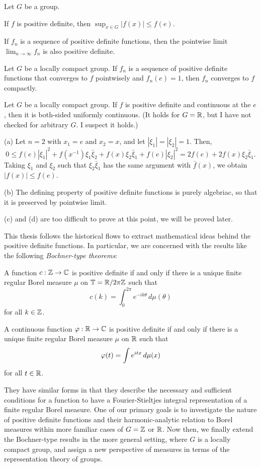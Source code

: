 \documentclass[12pt]{article}
\begin{document}
\begin{prop}
Let $G$ be a group.
\begin{parts}
\item If $f$ is positive definite, then $\sup_{x\in G}|f(x)|\le f(e)$.
\item If $f_n$ is a sequence of positive definite functions, then the pointwise limit $\lim_{n\to\infty}f_n$ is also positive definite.
\item Let $G$ be a locally compact group. If $f_n$ is a sequence of positive definite functions that converges to $f$ pointwisely and $f_n(e)=1$, then $f_n$ converges to $f$ compactly.
\item Let $G$ be a locally compact group. If $f$ is positive definite and continuous at the $e$, then it is both-sided uniformly continuous. (It holds for $G=\mathbb{R}$, but I have not checked for arbitrary $G$. I suspect it holds.)
\end{parts}
\end{prop}
\begin{pf}
(a)
Let $n=2$ with $x_1=e$ and $x_2=x$, and let $|\xi_1|=|\xi_2|=1$.
Then,
\[0\le f(e)|\xi_1|^2+f(x^{-1})\xi_1\bar\xi_2+f(x)\xi_2\bar\xi_1+f(e)|\xi_2|^2=2f(e)+2f(x)\xi_2\bar\xi_1.\]
Taking $\xi_1$ and $\xi_2$ such that $\xi_2\bar\xi_1$ has the same argument with $\bar f(x)$, we obtain $|f(x)|\le f(e)$.

(b)
The defining property of positive definite functions is purely algebriac, so that it is preserved by pointwise limit.

(c) and (d) are too difficult to prove at this point, we will be proved later.
\end{pf}

\bigskip

This thesis follows the historical flows to extract mathematical ideas behind the positive definite functions.
In particular, we are concerned with the results like the following \emph{Bochner-type theorems}:
\begin{thm}
A function $c:\mathbb{Z}\to\mathbb{C}$ is positive definite if and only if there is a unique finite regular Borel measure $\mu$ on $\mathbb{T}=\mathbb{R}/2\pi\mathbb{Z}$ such that
\[c(k)=\int_0^{2\pi}e^{-ik\theta}\,d\mu(\theta)\]
for all $k\in\mathbb{Z}$.
\end{thm}
\begin{thm}
A continuous function $\varphi:\mathbb{R}\to\mathbb{C}$ is positive definite if and only if there is a unique finite regular Borel measure $\mu$ on $\mathbb{R}$ such that
\[\varphi(t)=\int e^{itx}\,d\mu(x)\]
for all $t\in\mathbb{R}$.
\end{thm}
They have similar forms in that they describe the necessary and sufficient conditions for a function to have a Fourier-Stieltjes integral representation of a finite regular Borel measure.
One of our primary goals is to investigate the nature of positive definite functions and their harmonic-analytic relation to Borel measures within more familiar cases of $G=\mathbb{Z}$ or $\mathbb{R}$.
Now then, we finally extend the Bochner-type results in the more general setting, where $G$ is a locally compact group, and assign a new perspective of measures in terms of the representation theory of groups.
\end{document}
